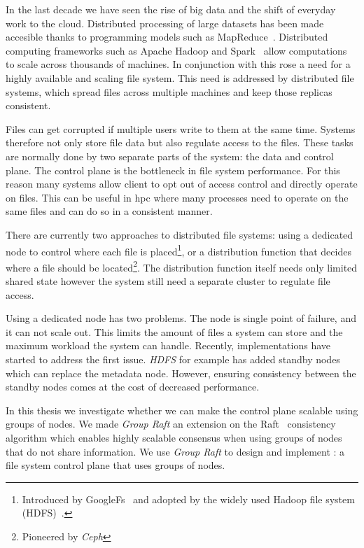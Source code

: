 In the last decade we have seen the rise of big data and the shift of everyday work to the cloud. Distributed processing of large datasets has been made accesible thanks to programming models such as MapReduce~\cite{mapReduce}. Distributed computing frameworks such as Apache Hadoop and Spark~\cite{spark} allow computations to scale across thousands of machines. In conjunction with this rose a need for a highly available and scaling file system. This need is addressed by distributed file systems, which spread files across multiple machines and keep those replicas consistent. 

Files can get corrupted if multiple users write to them at the same time. Systems therefore not only store file data but also regulate access to the files. These tasks are normally done by two separate parts of the system: the data and control plane. The control plane is the bottleneck in file system performance. For this reason many systems allow client to opt out of access control and directly operate on files. This can be useful in \ac{hpc} where many processes need to operate on the same files and can do so in a consistent manner.

There are currently two approaches to distributed file systems: using a dedicated node to control where each file is placed\footnote{Introduced by GoogleFs~\cite{GFS,GFS_interview} and adopted by the widely used Hadoop file system (HDFS)~\cite{hdfs}.}, or a distribution function that decides where a file should be located\footnote{Pioneered by \textit{Ceph}\cite{ceph}}. The distribution function itself needs only limited shared state however the system still need a separate cluster to regulate file access.

Using a dedicated node has two problems. The node is single point of failure, and it can not scale out. This limits the amount of files a system can store and the maximum workload the system can handle. Recently, implementations have started to address the first issue. \textit{HDFS} for example has added standby nodes \cite{hdfs_ha_nfs, hdfs_ha_q} which can replace the metadata node. However, ensuring consistency between the standby nodes comes at the cost of decreased performance.

In this thesis we investigate whether we can make the control plane scalable using groups of nodes. We made \textit{Group Raft} an extension on the Raft~\cite{raft} consistency algorithm which enables highly scalable consensus when using groups of nodes that do not share information. We use \textit{Group Raft} to design and implement \Name{}: a file system control plane that uses groups of nodes. 

